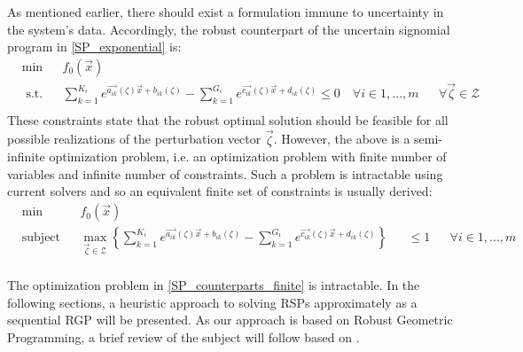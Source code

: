As mentioned earlier, there should exist a formulation immune to uncertainty in the system's data. Accordingly, the robust counterpart of the uncertain signomial program in \eqref{SP_exponential} is:
\begin{equation}
\begin{aligned}
& \min && f_0\left(\vec{x}\right) \\
& \text{ s.t.} && \textstyle{\sum}_{k=1}^{K_i}e^{\vec{a_{ik}}\left(\zeta\right)\vec{x} + b_{ik}\left(\zeta\right)} - \textstyle{\sum}_{k=1}^{G_i}e^{\vec{c_{ik}}\left(\zeta\right)\vec{x} + d_{ik}\left(\zeta\right)} \leq 0 \quad \forall i \in 1,...,m && \forall \vec{\zeta} \in \mathcal{Z}\\
\end{aligned}
\label{SP_counterparts}
\end{equation}
These constraints state that the robust optimal solution should be feasible for all possible realizations of the perturbation vector $\vec{\zeta}$. However, the above is a semi-infinite optimization problem, i.e. an optimization problem with finite number of variables and infinite number of constraints. Such a problem is intractable using current solvers and so an equivalent finite set of constraints is usually derived:
\begin{equation}
\begin{aligned}
& \min &&f_0\left(\vec{x}\right)\\
& \text{subject to} &&\max_{\vec{\zeta} \in \mathcal{Z}} \left\{\textstyle{\sum}_{k=1}^{K_i}e^{\vec{a_{ik}}\left(\zeta\right)\vec{x} + b_{ik}\left(\zeta\right)} - \textstyle{\sum}_{k=1}^{G_i}e^{\vec{c_{ik}}\left(\zeta\right)\vec{x} + d_{ik}\left(\zeta\right)}\right\} &&\leq 1 &&\forall i \in 1,...,m\\
\end{aligned}
\label{SP_counterparts_finite}
\end{equation}

The optimization problem in \eqref{SP_counterparts_finite} is intractable. In the following sections, a heuristic approach to solving RSPs approximately as a sequential RGP will be presented. As our approach is based on Robust Geometric Programming, a brief review of the subject will follow based on \cite{Saab2018}. 